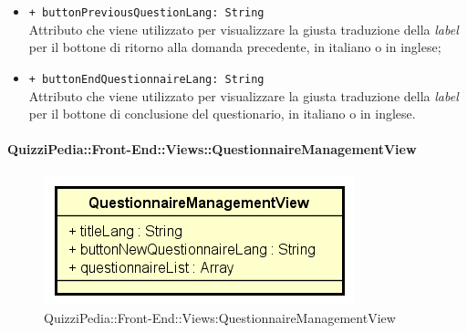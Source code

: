 \begin{itemize}
\begin{itemize}
			\item \texttt{+ buttonPreviousQuestionLang: String} \\ Attributo che viene utilizzato per visualizzare la giusta traduzione della \textit{label} per il bottone di ritorno alla domanda precedente, in italiano o in inglese;
			\item \texttt{+ buttonEndQuestionnaireLang: String} \\ Attributo che viene utilizzato per visualizzare la giusta traduzione della \textit{label} per il bottone di conclusione del questionario, in italiano o in inglese. 
		\end{itemize}
\end{itemize}


\paragraph{QuizziPedia::Front-End::Views::QuestionnaireManagementView}
\begin{figure} [ht]
	\centering
	\includegraphics[scale=0.80]{UML/Classi/Front-End/QuizziPedia_Front-end_QuestionnaireManagementView.png}
	\caption{QuizziPedia::Front-End::Views:QuestionnaireManagementView}
\end{figure} \FloatBarrier
